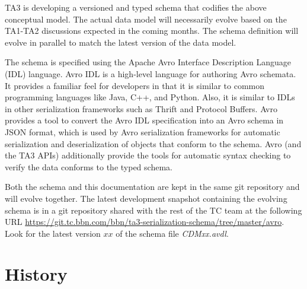 \documentclass[10pt, conference, onecolumn]{IEEEtran}
\begin{document}
TA3 is developing a versioned and typed schema that codifies the above
conceptual model. The actual data model will necessarily evolve based
on the TA1-TA2 discussions expected in the coming months.  The schema
definition will evolve in parallel to match the latest version of the
data model.

The schema is specified using the Apache Avro Interface Description
Language (IDL) language. Avro IDL is a high-level language for
authoring Avro schemata. It provides a familiar feel for developers in
that it is similar to common programming languages like Java, C++, and
Python. Also, it is similar to IDLs in other serialization
frameworks such as Thrift and Protocol Buffers. Avro provides a tool
to convert the Avro IDL specification into an Avro schema in JSON
format, which is used by Avro serialization frameworks for automatic
serialization and deserialization of objects that conform to the schema.
Avro (and the TA3 APIs) additionally provide the tools for automatic 
syntax checking to verify the data conforms to the typed schema.

Both the schema and this documentation are kept in the same git
repository and will evolve together. The latest development snapshot
containing the evolving schema is in a git repository shared with the
rest of the TC team at the following URL
\href{https://git.tc.bbn.com/bbn/ta3-serialization-schema/tree/master/avro}{https://git.tc.bbn.com/bbn/ta3-serialization-schema/tree/master/avro}.
Look for the latest version $xx$ of the schema file {\em CDMxx.avdl}.

\section{History}\label{sec:history}
\end{document}
